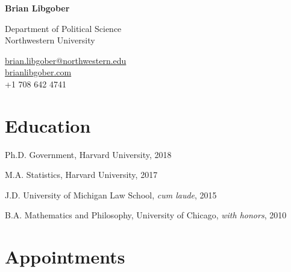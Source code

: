 \documentclass[12pt,letterpaper]{report}
\newcommand{\myname}{Brian Libgober}
\newcommand{\namefont}[1]{{\normalfont\bfseries\Huge{#1}}}
\begin{document}
    \raggedright{}

    \namefont{\myname}

    \vspace{1em}
    \begin{minipage}[t]{0.6\textwidth}
        \flushleft{} Department of Political Science \\
         Northwestern University
    \end{minipage}
    \hfill
    \begin{minipage}[t]{0.395\textwidth}
        \flushright{}
        \href{mailto:brian.libgober@northwestern.edu}{brian.libgober@northwestern.edu} \\
        \href{https://brianlibgober.com}{brianlibgober.com} \\
         +1 708 642 4741 \\
    \end{minipage}
    

    \section*{Education}

    \begin{tablist}

        \item[Ph.D.] \tab{}Government, Harvard University, 2018
        \item[M.A.]  \tab{}Statistics, Harvard University, 2017
        \item[J.D.]  \tab{}University of Michigan Law School, \textit{cum laude}, 2015
        \item[B.A.]  \tab{}Mathematics and Philosophy, University of Chicago, \textit{with honors}, 2010

    \end{tablist}

    \section*{Appointments}
\end{document}
